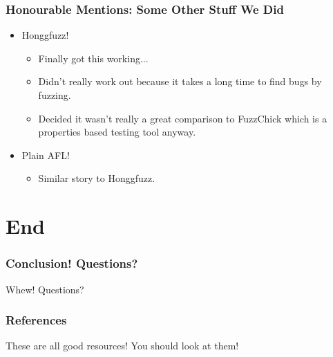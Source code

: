 \documentclass{beamer}
\begin{document}
\begin{frame}
  \frametitle{Honourable Mentions: Some Other Stuff We Did}

  \begin{itemize}
    \pause
  \item Honggfuzz!
    \pause
    \begin{itemize}
    \item Finally got this working...
    \item Didn't really work out because it takes a long time to find
      bugs by fuzzing.
    \item Decided it wasn't really a great comparison to FuzzChick
      which is a properties based testing tool anyway.
    \end{itemize}
    \pause
  \item Plain AFL!
    \pause
    \begin{itemize}
    \item Similar story to Honggfuzz.
    \end{itemize}
  \end{itemize}
\end{frame}

\section{End}

\begin{frame}
  \frametitle{Conclusion! Questions?}

  \huge{Whew! Questions?}
\end{frame}

\begin{frame}
  \frametitle{References}

  \nocite{*}
  \printbibliography

  These are all good resources! You should look at them!
\end{frame}
\end{document}
